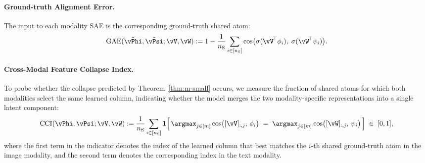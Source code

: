 \paragraph{Ground-truth Alignment Error.}
The input to each modality SAE is the corresponding ground-truth shared atom:
\begin{equation}
    \mathrm{GAE}(\tilde{\vPhi}, \tilde{\vPsi};  \vV, \vW)
    :=
    1-
    \frac{1}{n_{\mathrm S}}\sum_{i\in[n_{\mathrm S}]}
    \cos\!\big(\sigma(\vV^{\!\top}\phi_i),\;\sigma(\vW^{\!\top}\psi_i)\big).
\end{equation}

\paragraph{Cross-Modal Feature Collapse Index.}
To probe whether the collapse predicted by Theorem~\ref{thm:m-small} occurs, we measure the fraction of shared atoms for which both modalities select the same learned column, indicating whether the model merges the two modality-specific representations into a single latent component:
\begin{equation}
    \mathrm{CCI}(\vPhi, \vPsi; \vV, \vW)
    :=
    \frac{1}{n_{\mathrm S}}\sum_{i\in[n_{\mathrm S}]}
    \mathbf{1}\!\left[\,
    \argmax_{j\in[m]}
    \cos\!\big([\vV]_{:,j},\, \phi_i \big)
     \;=\;
     \argmax_{j\in[m]}
    \cos\!\big([\vW]_{:,j},\, \psi_i \big)
     \,
    \right]
    \;\in\;[0,1],
\end{equation}
where the first term in the indicator denotes the index of the learned column that best matches the $i$-th shared ground-truth atom in the image modality, and the second term denotes the corresponding index in the text modality.
